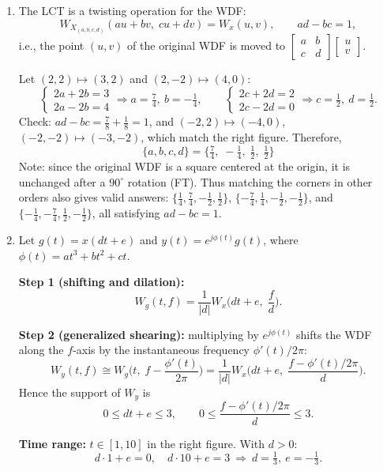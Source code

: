\documentclass[12pt,a4paper]{article}
\begin{document}
\begin{enumerate}
\item The LCT is a twisting operation for the WDF:
\[
W_{X_{(a,b,c,d)}}(au+bv,\;cu+dv)=W_x(u,v),\qquad ad-bc=1,
\]
i.e., the point $(u,v)$ of the original WDF is moved to $\begin{bmatrix}a&b\\c&d\end{bmatrix}\begin{bmatrix}u\\v\end{bmatrix}$.

Let $(2,2)\mapsto(3,2)$ and $(2,-2)\mapsto(4,0)$:
\[
\begin{cases}2a+2b=3\\2a-2b=4\end{cases}\Rightarrow a=\tfrac74,\ b=-\tfrac14,\qquad
\begin{cases}2c+2d=2\\2c-2d=0\end{cases}\Rightarrow c=\tfrac12,\ d=\tfrac12 .
\]
Check: $ad-bc=\frac78+\frac18=1$, and $(-2,2)\mapsto(-4,0)$, $(-2,-2)\mapsto(-3,-2)$, which match the right figure. Therefore,
\[
\boxed{\{a,b,c,d\}=\Big\{\tfrac74,\;-\tfrac14,\;\tfrac12,\;\tfrac12\Big\}}
\]
Note: since the original WDF is a square centered at the origin, it is unchanged after a $90^\circ$ rotation (FT). Thus matching the corners in other orders also gives valid answers: $\{\frac14,\frac74,-\frac12,\frac12\}$, $\{-\frac74,\frac14,-\frac12,-\frac12\}$, and $\{-\frac14,-\frac74,\frac12,-\frac12\}$, all satisfying $ad-bc=1$.

\item Let $g(t)=x(dt+e)$ and $y(t)=e^{j\phi(t)}g(t)$, where $\phi(t)=at^3+bt^2+ct$.

\textbf{Step 1 (shifting and dilation):}
\[
W_g(t,f)=\frac1{|d|}W_x\Big(dt+e,\;\frac fd\Big).
\]

\textbf{Step 2 (generalized shearing):} multiplying by $e^{j\phi(t)}$ shifts the WDF along the $f$-axis by the instantaneous frequency $\phi'(t)/2\pi$:
\[
W_y(t,f)\cong W_g\Big(t,\;f-\frac{\phi'(t)}{2\pi}\Big)=\frac1{|d|}W_x\Big(dt+e,\;\frac{f-\phi'(t)/2\pi}{d}\Big).
\]
Hence the support of $W_y$ is
\[
0\le dt+e\le3,\qquad 0\le\frac{f-\phi'(t)/2\pi}{d}\le3 .
\]

\textbf{Time range:} $t\in[1,10]$ in the right figure. With $d>0$:
\[
d\cdot1+e=0,\quad d\cdot10+e=3\ \Rightarrow\ d=\tfrac13,\ e=-\tfrac13 .
\]


\end{enumerate}
\end{document}
